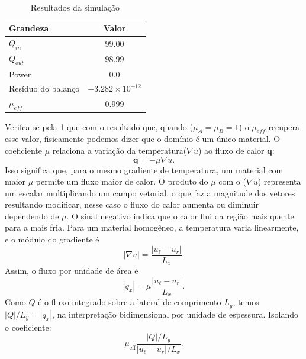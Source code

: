 \documentclass{article}
\begin{document}
\begin{table}[htbp]
	\centering
	\caption{Resultados da simulação}
	\label{tab:resultados_nonhomogen}
	\begin{tabular}{lc}
		\hline
		\textbf{Grandeza} & \textbf{Valor} \\
		\hline
		$Q_{in}$ & $99.00$ \\
		$Q_{out}$ & $98.99$ \\
		Power & $0.0$ \\
		Resíduo do balanço & $-3.282 \times 10^{-12}$ \\
		$\mu_{eff}$ & $0.999$ \\
		\hline
	\end{tabular}
\end{table}
Verifca-se pela \cref{tab:resultados_nonhomogen} que com o resultado que, quando ($\mu_{A} = \mu_{B} = 1$) o \(\mu_{eff}\) recupera esse valor, fisicamente podemos dizer que o domínio é um único material. 
O coeficiente \(\mu\) relaciona a variação da temperatura($\nabla u$) ao fluxo de calor $\mathbf q$:
\begin{equation*}
	\mathbf q=-\mu\nabla u.
\end{equation*}
Isso significa que, para o mesmo gradiente de temperatura, um material com maior \(\mu\) permite um fluxo maior de calor. O produto do $\mu$ com o ($\nabla u$) representa um escalar multiplicando um campo vetorial, o que faz a magnitude dos vetores resultando modificar, nesse caso o fluxo do calor aumenta ou diminuir dependendo de $\mu$. O sinal negativo indica que o calor flui da região mais quente para a mais fria.
Para um material homogêneo, a temperatura varia linearmente, e o módulo do gradiente é
\begin{equation*}
	|\nabla u|=\frac{|u_\ell-u_r|}{L_x}.
\end{equation*}
Assim, o fluxo por unidade de área é
\begin{equation*}
	|q_x|=\mu\frac{|u_\ell-u_r|}{L_x}.
\end{equation*}
Como \(Q\) é o fluxo integrado sobre a lateral de comprimento \(L_y\), temos \(|Q|/L_y=|q_x|\), na interpretação bidimensional por unidade de espessura. Isolando o coeficiente:
\begin{equation*}
	\mu_{\mathrm{eff}}
	\frac{|Q|/L_y}{|u_\ell-u_r|/L_x}.
\end{equation*}
\end{document}
